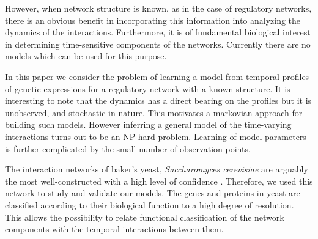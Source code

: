 \documentclass{bioinfo}
\begin{document}
However, when network structure is known, as in the case of regulatory networks, there is an obvious benefit in incorporating this information into analyzing the dynamics of the interactions. Furthermore, it is of fundamental biological interest in determining time-sensitive components of the networks.
Currently there are no models which can be used for this purpose.


In this paper we consider the problem of learning a model from 
temporal profiles of genetic expressions for a regulatory network 
with a known structure.
It is interesting to note that the dynamics has a direct bearing 
on the profiles but it is unobserved, and stochastic 
in nature.  This motivates a markovian approach for building such models.
However inferring a general model of the time-varying interactions turns out
to be an NP-hard problem. Learning of model parameters is further complicated by the
small number of observation points.  




The interaction networks of baker's
yeast, {\it Saccharomyces cerevisiae} are arguably the most
well-constructed with a high level of confidence
\citep{Petranovic2009}. Therefore, we used this network 
to study and validate our models. 
The genes and proteins in yeast are classified according to their biological function \citep{Mewes2007} to a high degree of resolution. This allows the possibility to relate functional classification of the network components with the temporal interactions between them.
\end{document}

